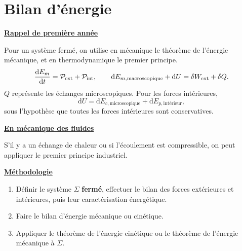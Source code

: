 \documentclass[11pt,a4paper]{article}
\newcommand{\dd}{\mathrm d}
\newcommand{\titr}[1]{\par\textbf{\underline{#1}}\par\nopagebreak[3]}
\begin{document}
\section{Bilan d'énergie}
\titr{Rappel de première année}
Pour un système fermé, on utilise en mécanique le théorème de l'énergie mécanique, et en thermodynamique le premier principe.
\[\frac{\dd E_m}{\dd t}=\Piext+\Piint,\qquad \dd E_{m,\mathrm{macroscopique}}+\dd U=\delta W_{\mathrm{ext}}+\delta Q.\]
$Q$ représente les échanges microscopiques. Pour les forces intérieures,
\[\dd U=\dd E_{c,\mathrm{microscopique}}+\dd E_{p,\text{intérieur}},\]
sous l'hypothèse que toutes les forces intérieures sont conservatives.
\titr{En mécanique des fluides}
S'il y a un échange de chaleur ou si l'écoulement est compressible, on peut appliquer le premier principe industriel.
\newpage
\titr{Méthodologie}
\begin{enumerate}\item Définir le système $\Sigma$ \textbf{fermé}, effectuer le bilan des forces extérieures et intérieures, puis leur caractérisation énergétique.
\item Faire le bilan d'énergie mécanique ou cinétique.
\item Appliquer le théorème de l'énergie cinétique ou le théorème de l'énergie mécanique à $\Sigma$.\end{enumerate}
\end{document}
